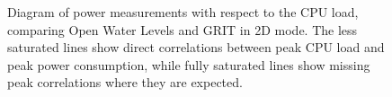 \documentclass[review]{elsarticle}
\begin{document}
\begin{figure}[htbp!]
\begin{center}
	 	\begin{minipage}{\columnwidth}
	 		\centering
	 	\end{minipage}
	 	\begin{minipage}{\columnwidth}
	 		\centering
	 	\end{minipage}
	\caption{Diagram of power measurements with respect to the CPU load, comparing Open Water Levels and GRIT in 2D mode. The less saturated lines show direct correlations between peak CPU load and peak power consumption, while fully saturated lines show missing peak correlations where they are expected.}
	\label{fig:power:CPU_2D_contrast}
\end{center}
\end{figure}
\end{document}
